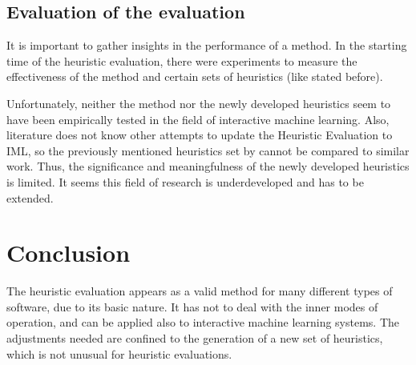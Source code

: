 \documentclass[sigchi]{acmart}
\begin{document}
\subsection{Evaluation of the evaluation}
It is important to gather insights in the performance of a method. In the starting time of the heuristic evaluation, there were experiments to measure the effectiveness of the method and certain sets of heuristics (like stated before).

Unfortunately, neither the method nor the newly developed heuristics seem to have been empirically tested in the field of interactive machine learning. Also, literature does not know other attempts to update the Heuristic Evaluation to IML, so the previously mentioned heuristics set by \citeauthor{imlheur2018} cannot be compared to similar work. Thus, the significance and meaningfulness of the newly developed heuristics is limited. It seems this field of research is underdeveloped and has to be extended.

\section{Conclusion}
The heuristic evaluation appears as a valid method for many different types of software, due to its basic nature. It has not to deal with the inner modes of operation, and can be applied also to interactive machine learning systems. The adjustments needed are confined to the generation of a new set of heuristics, which is not unusual for heuristic evaluations.



\end{document}

